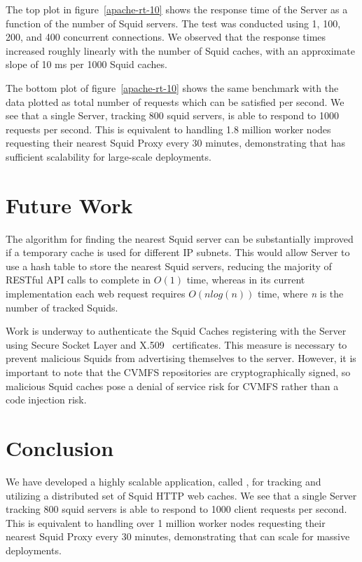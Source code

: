 \documentclass[a4paper]{jpconf}
\begin{document}
The top plot in figure~\ref{apache-rt-10} shows the response time of the \shoal Server 
as a function of the number of Squid servers. 
The test was conducted using 1, 100, 200, and 400 concurrent connections. 
We observed that the response times increased roughly linearly with the number of Squid caches, 
with an approximate slope of 10 ms per 1000 Squid caches. 

The bottom plot of figure~\ref{apache-rt-10} shows the same benchmark with the data 
plotted as total number of requests which can be satisfied per second. 
We see that a single \shoal Server, tracking 800 squid servers, is able to respond 
to 1000 requests per second. 
This is equivalent to handling 1.8 million worker nodes requesting their nearest Squid 
Proxy every 30 minutes, demonstrating that \shoal has sufficient scalability for large-scale 
deployments.


\section{Future Work}
The algorithm for finding the nearest Squid server can be substantially improved if a 
temporary cache is used for different IP subnets. 
This would allow \shoal Server to use a hash table to store the nearest Squid servers, reducing 
the majority of RESTful API calls to complete in $O(1)$ time, whereas in its current 
implementation each web request requires $O(nlog(n))$ time, where \textit{n} is the 
number of tracked Squids. 

Work is underway to authenticate the Squid Caches registering with the \shoal Server 
using Secure Socket Layer and X.509~\cite{ref:rfc3820} certificates. 
This measure is necessary to prevent malicious Squids from advertising themselves to the 
\shoal server. 
However, it is important to note that the CVMFS repositories are cryptographically signed, 
so malicious Squid caches pose a denial of service risk for CVMFS rather than a 
code injection risk.

\pagebreak
\section{Conclusion}
We have developed a highly scalable application, called \shoal, for tracking and utilizing 
a distributed set of Squid HTTP web caches.
We see that a single \shoal Server tracking 800 squid servers is able to respond to 1000 
client requests per second. 
This is equivalent to handling over 1 million worker nodes requesting their nearest 
Squid Proxy every 30 minutes, demonstrating that \shoal can scale for massive deployments.
\end{document}
